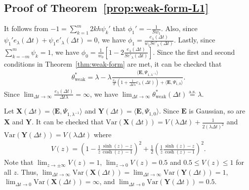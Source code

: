 \documentclass[final]{siamltex}
\begin{document}
\begin{appendices}
\subsection{ Proof of Theorem~\ref{prop:weak-form-L1}}\label{app:proof_prop45}
It follows from $-1 = \sum_{k=1}^m 2kh\psi_k'$ that $\phi_1'=-\frac{1}{Sw_1}$.
Also, since $\psi_1' e_\lambda(\Delta t) + \psi_1 e'_\lambda(\Delta t) = 0$, we have
$\phi_1 = \frac{e_\lambda(\Delta t)}{w_1Se'_\lambda(\Delta t)}$.
Lastly, since $\sum_{k=-m}^m \psi_k = 1$, we have 
$\phi_0 = \frac{1}{w_0}\left[ 1 - 2\frac{e_\lambda(\Delta t)}{S e'_\lambda(\Delta t)} \right]$.
Since the first and second conditions in Theorem~\ref{thm:weak-form} are met,
it can be checked that 
\begin{align*}
    \theta^*_\text{weak} = \lambda - \lambda \frac{\langle \bm{E},\Psi_{1,\lambda^{-1}}\rangle}{\frac{x_0}{\sigma}(1 +  \frac{1}{\Delta t \lambda}e_\lambda(\Delta t)) + \langle \bm{E},\Psi_{1,0}\rangle}.
\end{align*}
Since $\lim_{\Delta t \to \infty} \frac{e_\lambda(\Delta t)}{\Delta t \lambda} = \infty$,
we have 
$\lim_{\Delta t \to \infty} \theta^*_{\text{weak}}(\Delta t) \overset{\text{a.s.}}{=} \lambda.$


Let $\bm{X}(\Delta t)=\langle \bm{E},\Psi_{1,\lambda^{-1}}\rangle$ 
and $\bm{Y}(\Delta t)=\langle \bm{E},\Psi_{1,0}\rangle$.
Since $\bm{E}$ is Gaussian, so are $\bm{X}$ and $\bm{Y}$.
It can be checked that $\text{Var}(\bm{X}(\Delta t)) = V(\lambda \Delta t) + \frac{1}{2(\lambda \Delta t)^2}$ and $\text{Var}(\bm{Y}(\Delta t)) = V(\lambda \Delta t)$
where 
\begin{align*}
    V(z) = \left(1 - \frac{1}{z}\frac{\sinh(z)-z}{\cosh(z)-1}\right)^2 + \frac{1}{2}\left(\frac{1}{z}\frac{\sinh(z)-z}{\cosh(z)-1}\right)^2.
\end{align*}
Note that $\lim_{z \to \pm \infty} V(z) = 1$, $\lim_{z \to 0} V(z) = 0.5$
and $0.5 \le V(z) \le 1$ for all $z$.
Thus, $\lim_{\Delta t \to \infty} \text{Var}(\bm{X}(\Delta t)) = \lim_{\Delta t \to \infty} \text{Var}(\bm{Y}(\Delta t)) = 1$,
$\lim_{\Delta t \to 0} \text{Var}(\bm{X}(\Delta t)) = \infty$,
and 
$\lim_{\Delta t \to 0} \text{Var}(\bm{Y}(\Delta t)) = 0.5$.


\end{appendices}
\end{document}
